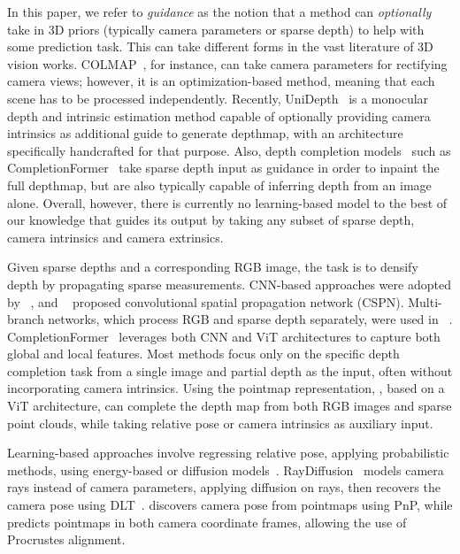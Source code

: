 In this paper, we refer to \emph{guidance} as the notion that a method can  \emph{optionally} take in 3D priors (typically camera parameters or sparse depth) to help with some prediction task.
This can take different forms in the vast literature of 3D vision works.
COLMAP~\cite{schonberger2016pixelwise}, for instance, can take camera parameters for rectifying camera views; however, it is an optimization-based method, meaning that each scene has to be processed independently. %
Recently, UniDepth~\cite{piccinelli2024unidepth} is a monocular depth and intrinsic estimation method capable of optionally providing camera intrinsics as additional guide to generate depthmap, with an architecture specifically handcrafted for that purpose.
Also, depth completion models~\cite{guidenet,bpnet,yan2024tri,lrru} such as CompletionFormer~\cite{completionformer2023} take sparse depth input as guidance in order to inpaint the full depthmap, but are also typically capable of inferring depth from an image alone.
Overall, however, there is currently no learning-based model to the best of our knowledge that guides its output by taking any subset of sparse depth, camera intrinsics and camera extrinsics.


Given sparse depths and a corresponding RGB image, the task is to densify  depth by propagating sparse measurements.
CNN-based approaches were adopted by ~\cite{ma2018self, ma2018sparse}, and ~\cite{cheng2018depth} proposed convolutional spatial propagation network (CSPN). 
Multi-branch networks, which process RGB and sparse depth separately, were used in ~\cite{hu2021penet, nazir2022semattnet, Qiu_2019_CVPR, guidenet, wvangansbeke2019sparse, zhang2018deepdepth, rho2022guideformer, yan2023rignet}.
CompletionFormer~\cite{completionformer2023} leverages both CNN and ViT architectures to capture both global and local features.
Most methods focus only on the specific depth completion task from a single image and partial depth as the input, often without incorporating camera intrinsics.
Using the pointmap representation, \ours{}, based on a ViT architecture, can complete the depth map from both RGB images and sparse point clouds, while taking relative pose or camera intrinsics as auxiliary input.


Learning-based approaches involve regressing relative pose, applying probabilistic methods, using energy-based or diffusion models~\cite{rockwell2022, zhang2022relpose, lin2024relpose++, balntas2017hpatches, wang2023posediffusion}.
RayDiffusion~\cite{raydiffusion} models camera rays instead of camera parameters, applying diffusion on rays, then recovers the camera pose using DLT~\cite{abdel1971direct}.
\duster{} discovers camera pose from pointmaps using PnP, while \ours{} predicts pointmaps in both camera coordinate frames, allowing the use of Procrustes alignment.

